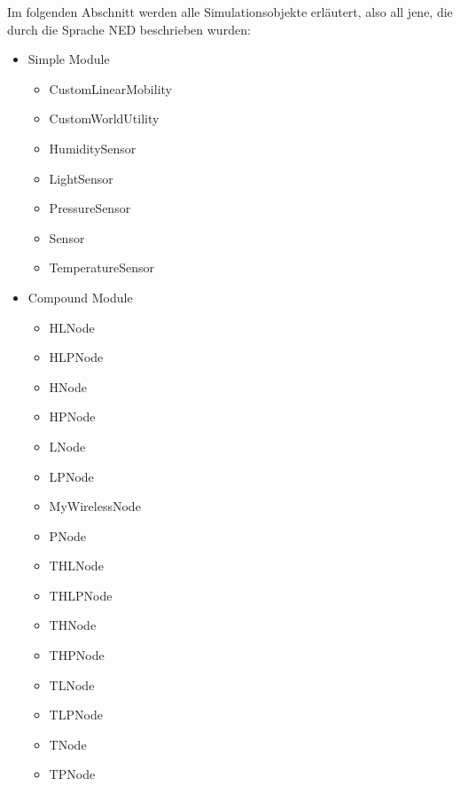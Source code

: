 Im folgenden Abschnitt werden alle Simulationsobjekte erläutert, also all jene, die durch die Sprache NED beschrieben wurden:

\begin{itemize}{\label{enum:Netzwerk}}
\item Simple Module
\begin{multicols}{2}
\begin{itemize}
\item CustomLinearMobility
\item CustomWorldUtility  
\item HumiditySensor
\item LightSensor
\item PressureSensor
\item Sensor
\item TemperatureSensor 
\end{itemize}
\end{multicols}
\item Compound Module
\begin{multicols}{2}
\begin{itemize}
\item HLNode
\item HLPNode
\item HNode
\item HPNode
\item LNode
\item LPNode
\item MyWirelessNode
\item PNode
\item THLNode
\item THLPNode
\item THNode
\item THPNode
\item TLNode
\item TLPNode
\item TNode
\item TPNode 
\end{itemize}
\end{multicols}
\end{itemize}


